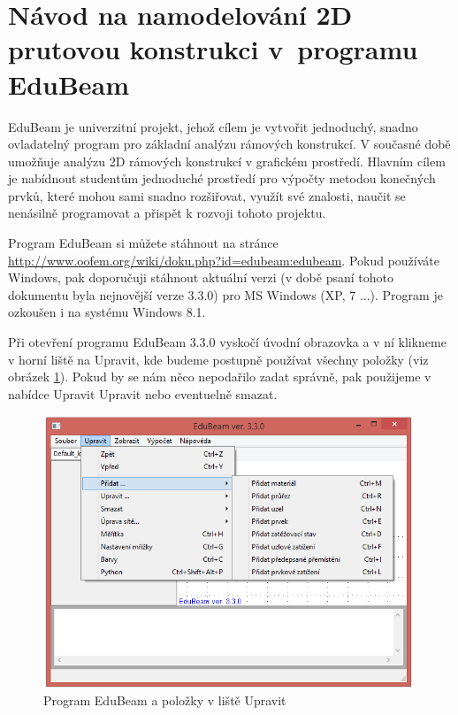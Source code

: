 \documentclass[12pt,fleqn]{article}
\begin{document}
\section*{Návod na namodelování 2D prutovou konstrukci v~programu EduBeam}

EduBeam je univerzitní projekt, jehož cílem je vytvořit jednoduchý, snadno ovladatelný program pro základní analýzu rámových konstrukcí. V současné době umožňuje analýzu 2D rámových konstrukcí v grafickém prostředí. Hlavním cílem je nabídnout studentům jednoduché prostředí pro výpočty metodou konečných prvků, které mohou sami snadno rozšiřovat, využít své znalosti, naučit se nenásilně programovat a přispět k rozvoji tohoto projektu.

Program EduBeam si můžete stáhnout na stránce \url{http://www.oofem.org/wiki/doku.php?id=edubeam:edubeam}. Pokud používáte Windows, pak doporučuji stáhnout aktuální verzi (v době psaní tohoto dokumentu byla nejnovější verze 3.3.0) pro MS Windows (XP, 7 ...). Program je ozkoušen i na systému Windows 8.1.

Při otevření programu EduBeam 3.3.0 vyskočí úvodní obrazovka a v ní klikneme v horní liště na Upravit, kde budeme postupně používat všechny položky (viz obrázek \ref{fig:EduBeam_upravy}). Pokud by se nám něco nepodařilo zadat správně, pak použijeme v nabídce Upravit Upravit nebo eventuelně smazat.

\begin{figure}[ht]
\centering
\includegraphics[width=0.99\textwidth]{figs/eduBeam_upravy.png}\caption{Program EduBeam a položky v liště Upravit}\label{fig:EduBeam_upravy}
\end{figure}
\end{document}
